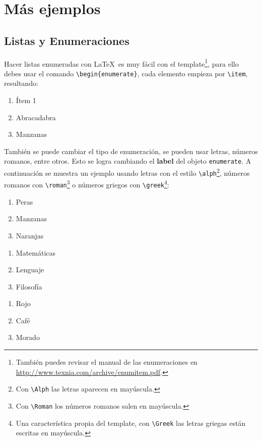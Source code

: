 \section{Más ejemplos}
	
	\subsection{Listas y Enumeraciones}
		
		Hacer listas enumeradas con \LaTeX\ es muy fácil con el template\footnote{También puedes revisar el manual de las enumeraciones en \url{http://www.texnia.com/archive/enumitem.pdf}.}, para ello debes usar el comando \texttt{\textbackslash begin\{enumerate\}}, cada elemento empieza por \texttt{\textbackslash item}, resultando:
		
		\begin{enumerate}
			\item Ítem 1
			\item Abracadabra
			\item Manzanas
		\end{enumerate}
		
		También se puede cambiar el tipo de enumeración, se pueden usar letras, números romanos, entre otros. Esto se logra cambiando el \textbf{label} del objeto \texttt{enumerate}. A continuación se muestra un ejemplo usando letras con el estilo \texttt{\textbackslash alph}\footnote{Con \texttt{\textbackslash Alph} las letras aparecen en mayúscula.}, números romanos con \texttt{\textbackslash roman}\footnote{Con \texttt{\textbackslash Roman} los números romanos salen en mayúscula.} o números griegos con \texttt{\textbackslash greek}\footnote{Una característica propia del template, con \texttt{\textbackslash Greek} las letras griegas están escritas en mayúscula.}:
		
		\begin{multicols}{3}
			\begin{enumerate}[label=\alph*) ,font=\bfseries] %
				\item Peras
				\item Manzanas
				\item Naranjas
			\end{enumerate}
			
			\begin{enumerate}[label=\greek*) ]
				\item Matemáticas
				\item Lenguaje
				\item Filosofía
			\end{enumerate}
		
			\begin{enumerate}[label=\roman*) ]
				\item Rojo
				\item Café
				\item Morado
			\end{enumerate}
		\end{multicols}
		
